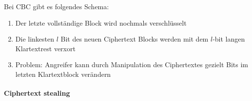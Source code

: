Bei CBC gibt es folgendes Schema:

\begin{enumerate}
    \item Der letzte vollständige Block wird nochmals verschlüsselt
    \item Die linkesten $l$ Bit des neuen Ciphertext Blocks werden mit dem $l$-bit langen Klartextrest verxort
    \item Problem: Angreifer kann durch Manipulation des Ciphertextes gezielt Bits im letzten Klartextblock verändern
\end{enumerate}

\paragraph{Ciphertext stealing}

